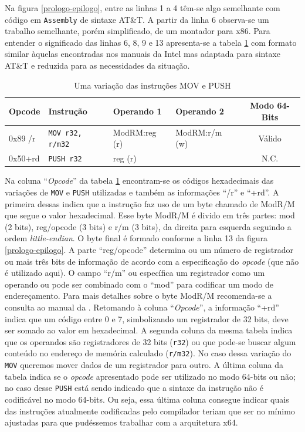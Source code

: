 Na figura \ref{prologo-epilogo}, entre as linhas 1 a 4 têm-se algo
semelhante com código em \texttt{Assembly} de sintaxe
AT\&T. A partir da linha 6 observa-se um trabalho semelhante, porém
simplificado, de um montador para x86. Para entender o significado das
linhas 6, 8, 9 e 13 apresenta-se a tabela \ref{mov-push-1} com formato
similar àquelas encontradas nos  manuais da Intel
\cite{intel_aam}\cite{intel_naz} mas
adaptada para sintaxe AT\&T e reduzida para as necessidades da situação.

\begin{table}
  \caption{Uma variação das instruções MOV e PUSH\label{mov-push-1}}
  \centering
  \begin{tabular}{l l l l c}
    \toprule
    Opcode  & Instrução     & Operando 1    & Operando 2    &  Modo 64-Bits \\
    \midrule
    0x89 /r & \verb!MOV r32, r/m32!& ModRM:reg (r) & ModRM:r/m (w) &  Válido       \\
    0x50+rd & \verb!PUSH r32!      & reg (r)       &               &  N.C.         \\
    \bottomrule
  \end{tabular}
\end{table}

Na coluna ``\textit{Opcode}'' da tabela \ref{mov-push-1} encontram-se
os códigos hexadecimais das variações de \verb!MOV! e \verb!PUSH!
utilizadas e também as informações ``/r'' e ``+rd''. A primeira dessas
indica que a instrução faz uso de um byte chamado de ModR/M que segue
o valor hexadecimal. Esse byte ModR/M é divido em três partes: mod (2 bits),
reg/opcode (3 bits) e r/m (3 bits), da direita para esquerda seguindo
a ordem \textit{little-endian}. O byte final é formado conforme
a linha 13 da figura \ref{prologo-epilogo}.
A parte ``reg/opcode'' determina ou um
número de registrador ou mais três bits de informação de acordo com
a especificação do \textit{opcode} (que não é utilizado aqui). O campo
``r/m'' ou específica um registrador como um operando ou pode ser
combinado com o ``mod'' para codificar um modo de endereçamento. Para
mais detalhes sobre o byte ModR/M recomenda-se a consulta ao manual da
. Retomando à coluna
``\textit{Opcode}'', a informação ``+rd'' indica que um código entre 0
e 7, simbolizando um registrador de 32 bits, deve ser somado ao valor
em hexadecimal. A segunda coluna da mesma tabela indica que os operandos são
registradores de 32 bits (\verb!r32!) ou que pode-se buscar algum
conteúdo no endereço de memória calculado (\verb!r/m32!). No
caso dessa variação do \verb!MOV! queremos mover dados de um
registrador para outro. A última coluna da tabela indica se o
\textit{opcode} apresentado pode ser utilizado no modo 64-bits ou não;
no caso desse \verb!PUSH! está sendo indicado que a sintaxe da instrução
não é codificável no modo 64-bits. Ou seja, essa última coluna
consegue indicar quais das instruções atualmente codificadas pelo
compilador teriam que ser no mínimo ajustadas para que pudéssemos
trabalhar com a arquitetura x64.

